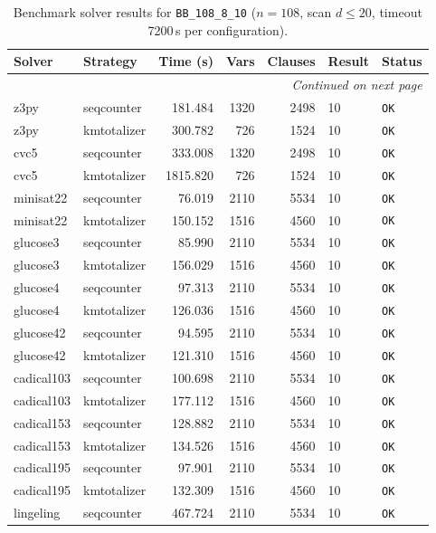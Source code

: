 \begin{longtable}{llrrrl p{}}
\caption{Benchmark solver results for \texttt{BB\_108\_8\_10} ($n=108$, scan $d \leq 20$, timeout 7200\,s per configuration).} \label{tab:bench-BB_108_8_10} \\
\toprule
Solver & Strategy & Time (s) & Vars & Clauses & Result & Status \\
\midrule
\endhead
\midrule
\multicolumn{7}{r}{\textit{Continued on next page}} \\
\midrule
\endfoot
\bottomrule
\endlastfoot
z3py & seqcounter & 181.484 & 1320 & 2498 & 10 & \texttt{OK} \\
z3py & kmtotalizer & 300.782 & 726 & 1524 & 10 & \texttt{OK} \\
cvc5 & seqcounter & 333.008 & 1320 & 2498 & 10 & \texttt{OK} \\
cvc5 & kmtotalizer & 1815.820 & 726 & 1524 & 10 & \texttt{OK} \\
minisat22 & seqcounter & 76.019 & 2110 & 5534 & 10 & \texttt{OK} \\
minisat22 & kmtotalizer & 150.152 & 1516 & 4560 & 10 & \texttt{OK} \\
glucose3 & seqcounter & 85.990 & 2110 & 5534 & 10 & \texttt{OK} \\
glucose3 & kmtotalizer & 156.029 & 1516 & 4560 & 10 & \texttt{OK} \\
glucose4 & seqcounter & 97.313 & 2110 & 5534 & 10 & \texttt{OK} \\
glucose4 & kmtotalizer & 126.036 & 1516 & 4560 & 10 & \texttt{OK} \\
glucose42 & seqcounter & 94.595 & 2110 & 5534 & 10 & \texttt{OK} \\
glucose42 & kmtotalizer & 121.310 & 1516 & 4560 & 10 & \texttt{OK} \\
cadical103 & seqcounter & 100.698 & 2110 & 5534 & 10 & \texttt{OK} \\
cadical103 & kmtotalizer & 177.112 & 1516 & 4560 & 10 & \texttt{OK} \\
cadical153 & seqcounter & 128.882 & 2110 & 5534 & 10 & \texttt{OK} \\
cadical153 & kmtotalizer & 134.526 & 1516 & 4560 & 10 & \texttt{OK} \\
cadical195 & seqcounter & 97.901 & 2110 & 5534 & 10 & \texttt{OK} \\
cadical195 & kmtotalizer & 132.309 & 1516 & 4560 & 10 & \texttt{OK} \\
lingeling & seqcounter & 467.724 & 2110 & 5534 & 10 & \texttt{OK} \\

\end{longtable}
